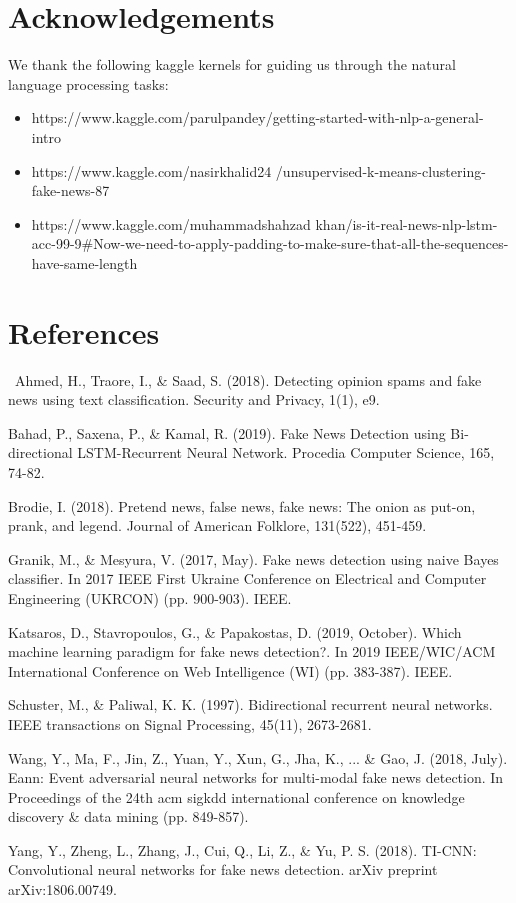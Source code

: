 \documentclass{article}
\begin{document}
\begin{multicols}{2}
\section{Acknowledgements}

We thank the following kaggle kernels for guiding us through the natural language processing tasks:
\begin{itemize}
    \item https://www.kaggle.com/parulpandey/getting-started-with-nlp-a-general-intro
    \item https://www.kaggle.com/nasirkhalid24 /unsupervised-k-means-clustering-fake-news-87
    \item https://www.kaggle.com/muhammadshahzad
    khan/is-it-real-news-nlp-lstm-acc-99-9#Now-we-need-to-apply-padding-to-make-sure-that-all-the-sequences-have-same-length
\end{itemize}


\section{References}

\quad \, Ahmed, H., Traore, I., \& Saad, S. (2018). Detecting opinion spams and fake news using text classification. Security and Privacy, 1(1), e9.

Bahad, P., Saxena, P., \& Kamal, R. (2019). Fake News Detection using Bi-directional LSTM-Recurrent Neural Network. Procedia Computer Science, 165, 74-82.

Brodie, I. (2018). Pretend news, false news, fake news: The onion as put-on, prank, and legend. Journal of American Folklore, 131(522), 451-459.

Granik, M., \& Mesyura, V. (2017, May). Fake news detection using naive Bayes classifier. In 2017 IEEE First Ukraine Conference on Electrical and Computer Engineering (UKRCON) (pp. 900-903). IEEE.

Katsaros, D., Stavropoulos, G., \& Papakostas, D. (2019, October). Which machine learning paradigm for fake news detection?. In 2019 IEEE/WIC/ACM International Conference on Web Intelligence (WI) (pp. 383-387). IEEE.

Schuster, M., \& Paliwal, K. K. (1997). Bidirectional recurrent neural networks. IEEE transactions on Signal Processing, 45(11), 2673-2681.

Wang, Y., Ma, F., Jin, Z., Yuan, Y., Xun, G., Jha, K., ... \& Gao, J. (2018, July). Eann: Event adversarial neural networks for multi-modal fake news detection. In Proceedings of the 24th acm sigkdd international conference on knowledge discovery & data mining (pp. 849-857).

Yang, Y., Zheng, L., Zhang, J., Cui, Q., Li, Z., \& Yu, P. S. (2018). TI-CNN: Convolutional neural networks for fake news detection. arXiv preprint arXiv:1806.00749.

\end{multicols}
\end{document}
